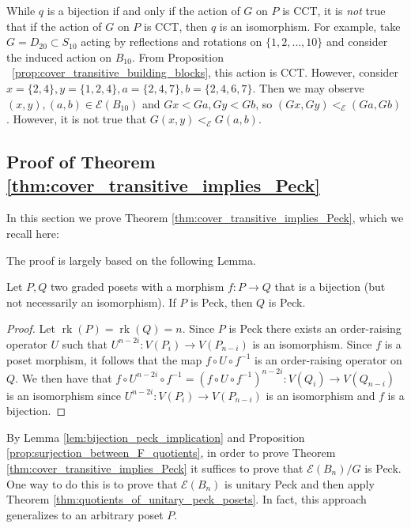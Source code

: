 \documentclass[smallextended, envcountsame, numbook]{svjour3}
\numberwithin{equation}{section}
\newcommand\ssec{\subsection}
\newcommand\rk{\operatorname{rk}}
\begin{document}
\begin{remark}
While $q$ is a bijection if and only if the action of $G$ on $P$ is CCT, it is {\it not} true that if the action of $G$ on $P$ is CCT, then $q$ is an isomorphism.  For example, take $G=D_{20} \subset S_{10}$ acting by reflections and rotations on $\{1,2,\ldots,10\}$ and consider the induced action on $B_{10}$. From Proposition ~\ref{prop:cover_transitive_building_blocks}, this action is CCT. However, consider $x = \{2,4\},y = \{1,2,4\},a = \{2,4,7\},b = \{2,4,6,7\}$. Then we may observe $(x , y),(a, b) \in \mathcal E(B_{10})$ and $Gx < Ga, Gy < Gb$, so $(Gx, Gy) <_{\mathcal E} (Ga, Gb)$. However, it is not true that $G(x, y)<_{\mathcal E} G(a,b)$.
\end{remark}

\ssec{Proof of Theorem \ref{thm:cover_transitive_implies_Peck}}\label{ssec:proof_of_cover_transitive_implies_Peck}

In this section we prove Theorem \ref{thm:cover_transitive_implies_Peck}, which we recall here:

\cctpeck*

The proof is largely based on the following Lemma.

\begin{lemma}\label{lem:bijection_peck_implication}
Let $P,Q$ two graded posets with a morphism $f\colon P\rightarrow Q$ that is a bijection (but not necessarily an isomorphism). If $P$ is Peck, then $Q$ is Peck.
\end{lemma}
\begin{proof}
Let $\rk(P) = \rk(Q) = n$.  Since $P$ is Peck there exists an order-raising operator $U$ such that $U^{n-2i}\colon V(P_i)\rightarrow V(P_{n-i})$ is an isomorphism.  Since $f$ is a poset morphism, it follows that the map $f\circ U\circ f^{-1}$ is an order-raising operator on $Q$.  We then have that $f\circ U^{n-2i}\circ f^{-1} = \left(f\circ U\circ f^{-1}\right)^{n-2i}\colon V(Q_i)\rightarrow V(Q_{n-i})$ is an isomorphism since $U^{n-2i}\colon V(P_i)\rightarrow V(P_{n-i})$ is an isomorphism and $f$ is a bijection.
\end{proof}

By Lemma \ref{lem:bijection_peck_implication} and Proposition \ref{prop:surjection_between_F_quotients}, in order to prove Theorem \ref{thm:cover_transitive_implies_Peck} it suffices to prove that $\mathcal E(B_n)/G$ is Peck.  One way to do this is to prove that $\mathcal E(B_n)$ is unitary Peck and then apply Theorem \ref{thm:quotients_of_unitary_peck_posets}.  In fact, this approach generalizes to an arbitrary poset $P$.
\end{document}
